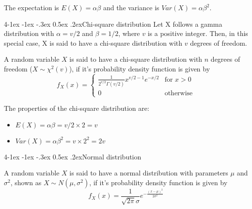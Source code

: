 \documentclass{tufte-handout}
\makeatletter
\renewcommand{\paragraph}{\@startsection{paragraph}%
    {4}{\z@}{-1ex \@plus -1ex \@minus -.3ex}%
    {0.5ex \@plus .2ex}{\normalfont\normalsize\bfseries}}
\makeatother
\begin{document}
The expectation is \( E(X) = \alpha \beta \) and the variance is \( Var(X) = \alpha \beta^2 \).

\paragraph{Chi-square distribution}
Let X follows a gamma distribution with \( \alpha = v/2 \) and \( \beta = 1/2 \), where \( v \) is a
positive integer. Then, in this special case, X is said to have a chi-square distribution with \( v \) degrees of freedom.
\begin{Definition}
    A random variable \( X \) is said to have a chi-square distribution with \( n \) degrees of freedom 
    (\( X \sim \chi^2(v) \)), if it's probability density function is given by
    \[ f_X(x) = \begin{cases}
        \frac{1}{2^{v/2} \Gamma(v/2)} x^{v/2 - 1} e^{-x/2} & \text{for } x > 0 \\
        0 & \text{otherwise}
    \end{cases} \]
\end{Definition}


The properties of the chi-square distribution are:
\begin{itemize}
    \item \( E(X) = \alpha \beta = v \slash 2 \times 2 = v \)
    \item \( Var(X) = \alpha \beta^2 = v \times 2^2 = 2v \)
\end{itemize}

\paragraph{Normal distribution}
\begin{Definition}
    A random variable \( X \) is said to have a normal distribution with parameters \( \mu \) and \( \sigma^2 \),
    shown as \( X \sim N(\mu, \sigma^2) \), if it's probability density function is given by
    \[ f_X(x) = \frac{1}{\sqrt{2\pi} \sigma} e^{-\frac{(x-\mu)^2}{2\sigma^2}} \]
\end{Definition}
\end{document}
